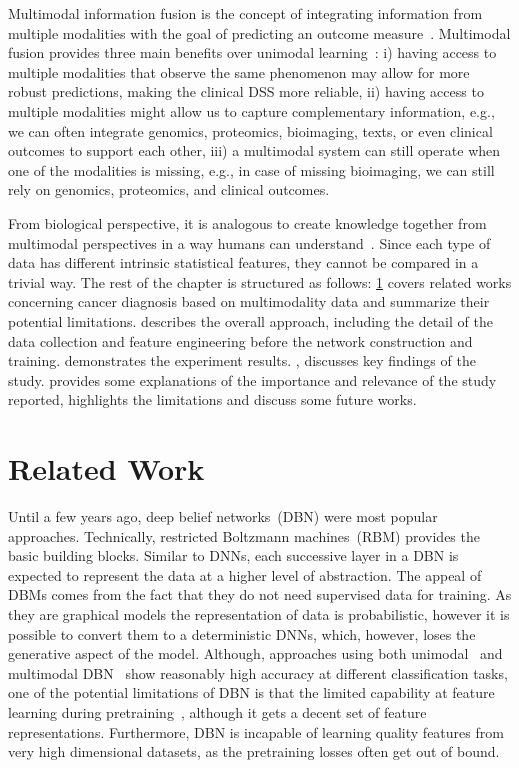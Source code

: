 \hspace*{3.5mm} Multimodal information fusion is the concept of integrating information from multiple modalities with the goal of predicting an outcome measure~\cite{mmsurvey,mmdcae}. Multimodal fusion provides three main benefits over unimodal learning~\cite{mmsurvey}: i) having access to multiple modalities that observe the same phenomenon may allow for more robust predictions, making the clinical DSS more reliable, ii) having access to multiple modalities might allow us to capture complementary information, e.g., we can often integrate genomics, proteomics, bioimaging, texts, or even clinical outcomes to support each other, iii) a multimodal system can still operate when one of the modalities is missing, e.g., in case of missing bioimaging, we can still rely on genomics, proteomics, and clinical outcomes.

\hspace*{3.5mm} From biological perspective, it is analogous to create knowledge together from multimodal perspectives in a way humans can understand~\cite{mmdcae}. Since each type of data has different intrinsic statistical features, they cannot be compared in a trivial way. The rest of the chapter is structured as follows: \cref{chapter_4:rw} covers related works concerning cancer diagnosis based on multimodality data and summarize their potential limitations.  describes the overall approach, including the detail of the data collection and feature engineering before the network construction and training.  demonstrates the experiment results. , discusses key findings of the study.  provides some explanations of the importance and relevance of the study reported, highlights the limitations and discuss some future works. %

\section{Related Work}\label{chapter_4:rw}
Until a few years ago, deep belief networks~(DBN) were most popular approaches. Technically, restricted Boltzmann machines~(RBM) provides the basic building blocks. Similar to DNNs, each successive layer in a DBN is expected to represent the data at a higher level of abstraction. The appeal of DBMs comes from the fact that they do not need supervised data for training. As they are graphical models the representation of data is probabilistic, however it is possible to convert them to a deterministic DNNs, which, however, loses the generative aspect of the model. Although, approaches using both unimodal~\cite{abdel2016breast} and multimodal DBN~\cite{liang} show reasonably high accuracy at different classification tasks, one of the potential limitations of DBN is that the limited capability at feature learning during pretraining~\cite{serban2016multi}, although it gets a decent set of feature representations. Furthermore, DBN is incapable of learning quality features from very high dimensional datasets, as the pretraining losses often get out of bound. %

